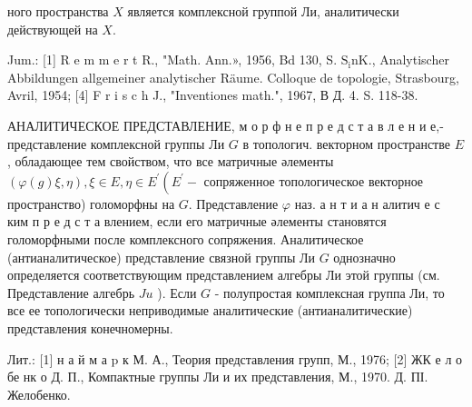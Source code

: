 \documentclass[10pt]{article}
\begin{document}
ного пространства $X$ является комплексной группой Ли, аналитически действующей на $X$.



Jum.: [1] R e m m e r t R., "Math. Ann.», 1956, Bd 130, S. $\mathrm{S}_{\mathrm{i}} \mathrm{n} \mathrm{K}$., Analytischer Abbildungen allgemeiner analytischer Räume. Colloque de topologie, Strasbourg, Avril, 1954; [4] F r i s c h J., "Inventiones math.", 1967, В Д. 4. S. 118-38.



АНАЛИТИЧЕСКОЕ ПРЕДСТАВЛЕНИЕ, м о р ф н е п р е д с т а в л е н и е,- представление комплексной группы Ли $G$ в топологич. векторном пространстве $E$, обладающее тем свойством, что все матричные әлементы $(\varphi(g) \xi, \eta), \xi \in E, \eta \in E^{\prime}\left(E^{\prime}-\right.$ сопряженное топологическое векторное пространство) голоморфны на $G$. Представление $\varphi$ наз. а н т и а н алитич е с ким п р е д с т а влением, если его матричные әлементы становятся голоморфными после комплексного сопряжения. Аналитическое (антианалитическое) представление связной группы Ли $G$ однозначно определяется соответствующим представлением алгебры Ли этой группы (см. Представление алгебрь $J u$ ). Если $G$ - полупростая комплексная группа Ли, то все ее топологически неприводимые аналитические (антианалитические) представления конечномерны.



Лит.: [1] н а й м а $\mathrm{p}$ к М. А., Теория представления групп, М., 1976; [2] ЖК е л о бе нк о Д. П., Компактные группы Ли и их представления, М., 1970. Д. ПІ. Желобенко.
\end{document}
